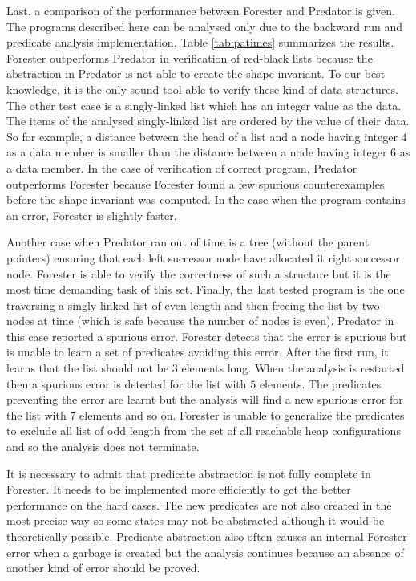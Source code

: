 Last, a comparison of the performance
between Forester and Predator is given.
The programs described here can be analysed only due to the
backward run and predicate analysis implementation.
Table \ref{tab:patimes} summarizes the results.
Forester outperforms Predator in verification of red-black lists
because the abstraction in Predator is not able to create the shape invariant.
To our best knowledge, it is the only sound tool able to verify these
kind of data structures.
The other test case is a singly-linked list which
has an integer value as the data.
The items of the analysed singly-linked list are ordered
by the value of their data.
So for example, a distance between the head of a list and a 
node having integer $4$ as a data member is smaller than
the distance between a node having integer $6$ as a data member.
In the case of verification of correct program, Predator outperforms Forester
because Forester found a few spurious counterexamples
before the shape invariant was computed.
In the case when the program contains an error, Forester is slightly faster.

Another case when Predator ran out of time
is a tree (without the parent pointers) ensuring
that each left successor node have allocated it
right successor node.
Forester is able to verify the correctness of such a structure
but it is the most time demanding task of this set.
Finally, the~last tested program is the one traversing
a singly-linked list of even length and then
freeing the list by two nodes at time (which is safe because
the number of nodes is even).
Predator in this case reported a spurious error.
Forester detects that the error is spurious but is
unable to learn a set of predicates avoiding this error.
After the first run, it learns that the list should not be
$3$ elements long.
When the analysis is restarted then a spurious error is
detected for the list with $5$ elements.
The predicates preventing the error are learnt
but the analysis will find a new spurious error for
the list with $7$ elements and so on.
Forester is unable to generalize the predicates
to exclude all list of odd length from the set of all reachable
heap configurations and so the analysis does not terminate.

It is necessary to admit that predicate abstraction
is not fully complete in Forester.
It needs to be implemented more efficiently to get the better
performance on the hard cases.
The new predicates are not also created in the most
precise way so some states may not be abstracted
although it would be theoretically possible.
Predicate abstraction also often causes an internal
Forester error when a garbage is created but the
analysis continues because an absence of another
kind of error should be proved.

